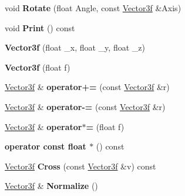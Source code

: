 \begin{DoxyCompactItemize}
\item 
\hypertarget{structVector3f_aa38c378d40f62c1430271571093674ac}{void {\bfseries Rotate} (float Angle, const \hyperlink{structVector3f}{Vector3f} \&Axis)}\label{structVector3f_aa38c378d40f62c1430271571093674ac}

\item 
\hypertarget{structVector3f_a62c1600e55fde7646bebbbcb2cca2fe3}{void {\bfseries Print} () const }\label{structVector3f_a62c1600e55fde7646bebbbcb2cca2fe3}

\item 
\hypertarget{structVector3f_ac2caf1fd41076826fe50b3a527ef90db}{{\bfseries Vector3f} (float \-\_\-x, float \-\_\-y, float \-\_\-z)}\label{structVector3f_ac2caf1fd41076826fe50b3a527ef90db}

\item 
\hypertarget{structVector3f_a0866ef2153242165a626102b48284b34}{{\bfseries Vector3f} (float f)}\label{structVector3f_a0866ef2153242165a626102b48284b34}

\item 
\hypertarget{structVector3f_abb9089cd5b410ea28b1d1db63fc550f8}{\hyperlink{structVector3f}{Vector3f} \& {\bfseries operator+=} (const \hyperlink{structVector3f}{Vector3f} \&r)}\label{structVector3f_abb9089cd5b410ea28b1d1db63fc550f8}

\item 
\hypertarget{structVector3f_a63ec561fd67ea011aa973c0549d48a26}{\hyperlink{structVector3f}{Vector3f} \& {\bfseries operator-\/=} (const \hyperlink{structVector3f}{Vector3f} \&r)}\label{structVector3f_a63ec561fd67ea011aa973c0549d48a26}

\item 
\hypertarget{structVector3f_a0449c07194a079d3eb57961e374e96ee}{\hyperlink{structVector3f}{Vector3f} \& {\bfseries operator$\ast$=} (float f)}\label{structVector3f_a0449c07194a079d3eb57961e374e96ee}

\item 
\hypertarget{structVector3f_af7cb77a7d58c931f103cd8d160e765c6}{{\bfseries operator const float $\ast$} () const }\label{structVector3f_af7cb77a7d58c931f103cd8d160e765c6}

\item 
\hypertarget{structVector3f_aa08a1a02eb2e991f26231edeb0811acf}{\hyperlink{structVector3f}{Vector3f} {\bfseries Cross} (const \hyperlink{structVector3f}{Vector3f} \&v) const }\label{structVector3f_aa08a1a02eb2e991f26231edeb0811acf}

\item 
\hypertarget{structVector3f_a029dc1940f2ded84c933d89179ae95c6}{\hyperlink{structVector3f}{Vector3f} \& {\bfseries Normalize} ()}\label{structVector3f_a029dc1940f2ded84c933d89179ae95c6}


\end{DoxyCompactItemize}
